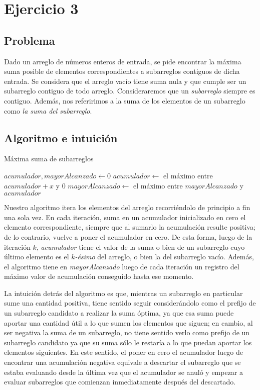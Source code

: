 \section{Ejercicio 3}

\subsection{Problema}
Dado un arreglo de números enteros de entrada, se pide encontrar la máxima suma posible de elementos correspondientes a subarreglos contiguos de dicha entrada. Se considera que el arreglo vacío tiene suma nula y que cumple ser un subarreglo contiguo de todo arreglo. Consideraremos que un \textit{subarreglo} siempre es contiguo. Además, nos referirimos a la suma de los elementos de un subarreglo como \textit{la suma del subarreglo}.

\subsection{Algoritmo e intuición}

\begin{algorithm}[H]
	\caption{Máxima suma de subarreglos}
    $\mathit{acumulador, mayorAlcanzado} \gets 0$ \;
     {
        $\mathit{acumulador} \gets$ el máximo entre $\mathit{acumulador}+x$ y $0$ \;
        $\mathit{mayorAlcanzado} \gets$ el máximo entre $\mathit{mayorAlcanzado}$ y $\mathit{acumulador}$
    }
\end{algorithm}

\bigskip

Nuestro algoritmo itera los elementos del arreglo recorriéndolo de principio a fin una sola vez. En cada iteración, suma en un acumulador inicializado en cero el elemento correspondiente, siempre que al sumarlo la acumulación resulte positiva; de lo contrario, vuelve a poner el acumulador en cero. De esta forma, luego de la iteración $k$, \textit{acumulador} tiene el valor de la suma o bien de un subarreglo cuyo último elemento es el $k$\textit{-ésimo} del arreglo, o bien la del subarreglo vacío. Además, el algoritmo tiene en \textit{mayorAlcanzado} luego de cada iteración un registro del máximo valor de acumulación conseguido hasta ese momento.

La intuición detrás del algoritmo es que, mientras un subarreglo en particular sume una cantidad positiva, tiene sentido seguir considerándolo como el prefijo de un subarreglo candidato a realizar la suma óptima, ya que esa suma puede aportar una cantidad útil a lo que sumen los elementos que siguen; en cambio, al ser negativa la suma de un subarreglo, no tiene sentido verlo como prefijo de un subarreglo candidato ya que su suma sólo le restaría a lo que puedan aportar los elementos siguientes. En este sentido, el poner en cero el acumulador luego de encontrar una acumulación negativa equivale a descartar el subarreglo que se estaba evaluando desde la última vez que el acumulador se anuló y empezar a evaluar subarreglos que comienzan inmediatamente después del descartado.

